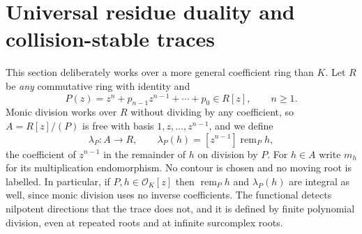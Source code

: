 \documentclass[11pt,letterpaper]{article}
\numberwithin{equation}{section}
\theoremstyle{definition}
\theoremstyle{remark}\newtheorem{remark}[theorem]{Remark}
\newcommand{\OO}{\mathcal O}
\newcommand{\rem}{\operatorname{rem}}
\begin{document}
\section{Universal residue duality and collision-stable traces}
\label{polynomial:sec:residue}
This section deliberately works over a more general coefficient ring than $K$.
Let $R$ be \emph{any} commutative ring with identity and
\[
 P(z)=z^n+p_{n-1}z^{n-1}+\cdots+p_0\in R[z],\qquad n\ge1 .
\]
Monic division works over $R$ without dividing by any coefficient, so
$A=R[z]/(P)$ is free with basis $1,z,\ldots,z^{n-1}$, and we define
\begin{equation}\label{polynomial:eq:lambdadef}
 \lambda_P:A\longrightarrow R,\qquad
 \lambda_P(h)=[z^{n-1}]\rem_P h ,
\end{equation}
the coefficient of $z^{n-1}$ in the remainder of $h$ on division by $P$. For
$h\in A$ write $m_h$ for its multiplication endomorphism. No contour is
chosen and no moving root is labelled. In particular, if $P,h\in\OO_K[z]$ then
$\rem_Ph$ and $\lambda_P(h)$ are integral as well, since monic division uses
no inverse coefficients. The functional detects nilpotent directions that the
trace does not, and it is defined by finite polynomial division, even at
repeated roots and at infinite surcomplex roots.
\end{document}
